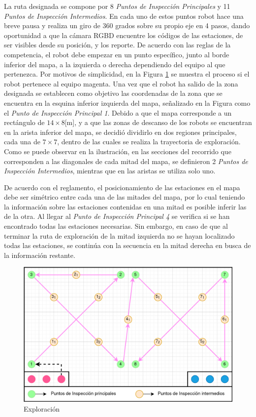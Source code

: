 La ruta designada se compone por 8 \textit{Puntos de Inspección Principales} y 11 \textit{Puntos de Inspección Intermedios}. En cada uno de estos puntos robot hace una breve pausa y realiza un giro de 360 grados sobre su propio eje en 4 pasos, dando oportunidad a que la cámara RGBD encuentre los códigos de las estaciones, de ser visibles desde su posición, y los reporte. De acuerdo con las reglas de la competencia, el robot debe empezar en un punto específico, junto al borde inferior del mapa, a la izquierda o derecha dependiendo del equipo al que pertenezca. Por motivos de simplicidad, en la Figura \ref{fig:Route_Exploration} se muestra el proceso si el robot pertenece al equipo magenta.
Una vez que el robot ha salido de la zona designada se establecen como objetivo las coordenadas de la zona que se encuentra en la esquina inferior izquierda del mapa, señalizado en la Figura como el \textit{Punto de Inspección Principal 1}. 
Debido a que el mapa corresponde a un rectángulo de $14\times8$[m], y a que las zonas de descanso de los robots se encuentran en la arista inferior del mapa, se decidió dividirlo en dos regiones principales, cada una de $7\times7$, dentro de las cuales se realiza la trayectoria de exploración.  
Como se puede observar en la ilustración, en las secciones del recorrido que corresponden a las diagonales de cada mitad del mapa, se definieron 2 \textit{Puntos de Inspección Intermedios}, mientras que en las aristas se utiliza solo uno. 

De acuerdo con el reglamento, el posicionamiento de las estaciones en el mapa debe ser simétrico entre cada una de las mitades del mapa, por lo cual teniendo la información sobre las estaciones contenidas en una mitad es posible inferir las de la otra. Al llegar al \textit{Punto de Inspección Principal 4} se verifica si se han encontrado todas las estaciones necesarias. Sin embargo, en caso de que al terminar la ruta de exploración de la mitad izquierda no se hayan localizado todas las estaciones, se continúa con la secuencia en la mitad derecha en busca de la información restante. 

\begin{figure}[ht]
    \centering
    \includegraphics[scale= 0.3]{Figures/Exploration_route.png}
        \caption{Exploración}
        \label{fig:Route_Exploration}
    \end{figure}

